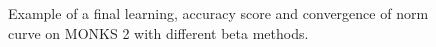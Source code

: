 \begin{appendices}
\begin{figure}[H]
\begin{subfigure}{0.40\textwidth}
                    \label{fig:monks_2_ACC_CGD}
                \end{subfigure}
                \begin{subfigure}{0.40\textwidth}
                    \caption{}
                    \label{fig:monks_2_NORM_CGD}
                \end{subfigure}
                \caption{Example of a final learning, accuracy score and convergence of norm curve on MONKS 2 with different beta methods.}
                \label{fig:monks_2_CGD}
            \end{figure}


\end{appendices}
